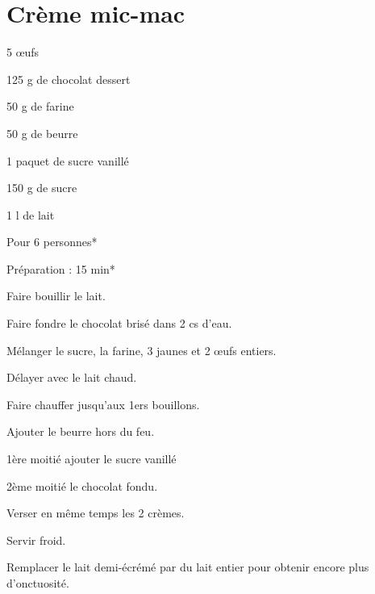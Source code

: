 \section{Crème mic-mac}

\begin{ingredients}
\item 5 œufs
\item 125 g de chocolat dessert
\item 50 g de farine
\item 50 g de beurre
\item 1 paquet de sucre vanillé
\item 150 g de sucre
\item 1 l de lait
\end{ingredients}
\begin{infos}
\item Pour 6 personnes*		%
\item Préparation : 15 min*		%
\end{infos}
\begin{etapes}
\item Faire bouillir le lait.
\item Faire fondre le chocolat brisé dans 2 cs d’eau.
\item Mélanger le sucre, la farine, 3 jaunes et 2 œufs entiers.
\item Délayer avec le lait chaud.
\item Faire chauffer jusqu’aux 1ers bouillons.
\item Ajouter le beurre hors du feu.
\item 1ère moitié ajouter le sucre vanillé
\item 2ème moitié le chocolat fondu.
\item Verser en même temps les 2 crèmes.
\item Servir froid.
\end{etapes}
\begin{conseils}
Remplacer le lait demi-écrémé par du lait entier pour obtenir encore plus d'onctuosité.
\end{conseils}

